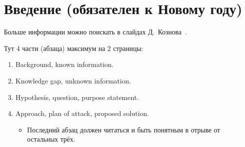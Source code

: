 
\section*{Введение (обязателен к Новому году)}
Больше информации можно поискать в слайдах Д.~Кознова~\cite{koznov}.

Тут  4 части (абзаца) максимум на 2 страницы:
\begin{enumerate}
\item Background, known information.
\item Knowledge gap, unknown information.
\item  Hypothesis, question, purpose statement.
\item Approach, plan of attack, proposed solution.
\begin{itemize}
\item Последний абзац должен читаться и быть понятным в отрыве от остальных трёх.
\end{itemize}
\end{enumerate}




